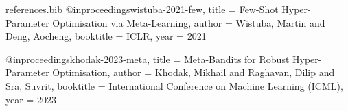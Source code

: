 \begin{filecontents*}[overwrite]{references.bib}
@inproceedings{wistuba-2021-few,
  title     = {Few-Shot Hyper-Parameter Optimisation via Meta-Learning},
  author    = {Wistuba, Martin and Deng, Aocheng},
  booktitle = {ICLR},
  year      = {2021}
}

@inproceedings{khodak-2023-meta,
  title     = {Meta-Bandits for Robust Hyper-Parameter Optimisation},
  author    = {Khodak, Mikhail and Raghavan, Dilip and Sra, Suvrit},
  booktitle = {International Conference on Machine Learning (ICML)},
  year      = {2023}
}
\end{filecontents*}

\documentclass{article} %

\usepackage[utf8]{inputenc}  %
\usepackage[T1]{fontenc}     %
\usepackage{lmodern}         %
\usepackage[demo]{graphicx}  %
\usepackage{hyperref}        %
\usepackage{url}             %
\usepackage{booktabs}        %
\usepackage{amsfonts}        %
\usepackage{nicefrac}        %
\usepackage{microtype}       %
\usepackage{titletoc}
\usepackage{natbib}          %

\usepackage{subcaption}
\usepackage{amsmath}
\usepackage{multirow}
\usepackage{color}
\usepackage{colortbl}
\usepackage{cleveref}
\usepackage{algorithm}
\usepackage{algorithmicx}
\usepackage{algpseudocode}
\usepackage{tikz}
\usepackage{pgfplots}
\usepackage{float}
\usepackage{array}
\usepackage{tabularx}
\pgfplotsset{compat=newest}

\DeclareMathOperator*{\argmin}{arg\,min}
\DeclareMathOperator*{\argmax}{arg\,max}

\graphicspath{{images/}}

